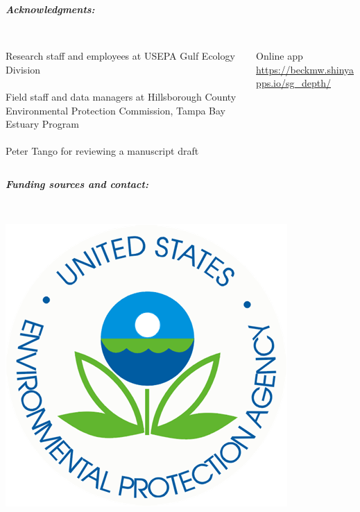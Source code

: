 \documentclass[serif]{beamer}\usepackage[]{graphicx}\usepackage[]{color}
\newcommand{\emtxt}[1]{\textbf{\textit{{\color{mypal4} #1}}}}
\begin{document}
\begin{frame}
\emtxt{Acknowledgments:}\\~\\
\begin{columns}
\begin{column}{0.55\textwidth}
{\footnotesize
Research staff and employees at USEPA Gulf Ecology Division \\~\\
Field staff and data managers at Hillsborough County Environmental Protection Commission, Tampa Bay Estuary Program\\~\\
Peter Tango for reviewing a manuscript draft
}
\end{column}
\begin{column}{0.4\textwidth}
\vspace{-0.2in}
\begin{center}
{\tiny
Online app \href{https://beckmw.shinyapps.io/sg_depth/}{https://beckmw.shinyapps.io/sg\_depth/}\\~\\
}
\centerline{}
\end{center}
\end{column}
\end{columns}
\vfill
\emtxt{Funding sources and contact:}\\~\\
\begin{columns}
\begin{column}{0.5\textwidth}
\centerline{\includegraphics[width=0.4\linewidth]{fig/epa_logo.png}}

\end{column}
\end{columns}
\end{frame}
\end{document}
